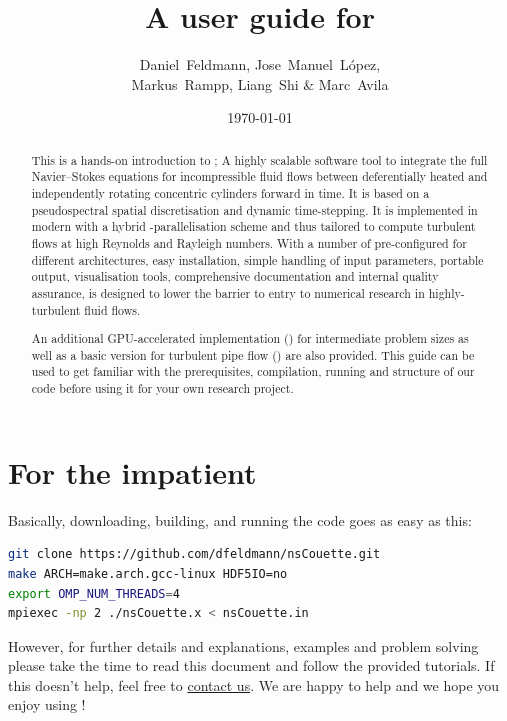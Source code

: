 \documentclass[a4paper, 11pt, DIV=11]{scrartcl}
\title{A user guide for \nsc}
\author{Daniel~Feldmann, Jose~Manuel~L\'opez,\\ Markus~Rampp, Liang~Shi \& Marc~Avila}
\date{\today}
\begin{document}
\maketitle

\begin{abstract}
This is a hands-on introduction to \nsc; A highly scalable software tool
to integrate the full Navier--Stokes equations for incompressible fluid
flows between deferentially heated and independently rotating concentric
cylinders forward in time. It is based on a pseudospectral spatial
discretisation and dynamic time-stepping. It is implemented in modern
\fortran with a hybrid \mpi-\omp parallelisation scheme and thus tailored
to compute turbulent flows at high Reynolds and Rayleigh numbers. With a
number of pre-configured  for different architectures,
easy installation, simple handling of input parameters, portable
 output, visualisation tools, comprehensive documentation and
internal quality assurance, \nsc is designed to lower the barrier to entry
to numerical research in highly-turbulent fluid flows.
\par
An additional GPU-accelerated implementation (\cuda) for intermediate problem
sizes as well as a basic version for turbulent pipe flow (\nsp) are also
provided. This guide can be used to get familiar with the prerequisites,
compilation, running and structure of our code before using it for your
own research project.
\end{abstract}
\tableofcontents

\section{For the impatient}
\label{sec:forTheImpatient}

Basically, downloading, building, and running the code goes as easy as this:
\begin{lstlisting}[language=bash]
git clone https://github.com/dfeldmann/nsCouette.git
make ARCH=make.arch.gcc-linux HDF5IO=no
export OMP_NUM_THREADS=4
mpiexec -np 2 ./nsCouette.x < nsCouette.in
\end{lstlisting}
However, for further details and explanations, examples and problem solving
please take the time to read this document and follow the provided tutorials.
If this doesn't help, feel free to \href{mailto:nsCouette@zarm.uni-bremen.de}{contact us}.
We are happy to help and we hope you enjoy using \nsc!
\end{document}
